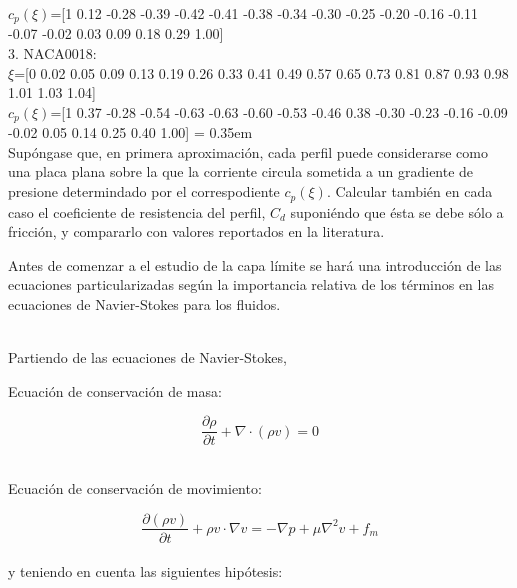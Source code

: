 \documentclass[11pt,a4paper]{article}
\begin{document}
$c_{p}(\xi)$=[1 0.12 -0.28 -0.39 -0.42 -0.41 -0.38 -0.34 -0.30 -0.25 -0.20 -0.16 -0.11 -0.07 -0.02 0.03 0.09 0.18 0.29 1.00]
\\

3. NACA0018:
\\

\hspace{1cm}
$\xi$=[0 0.02 0.05 0.09 0.13 0.19 0.26 0.33 0.41 0.49 0.57 0.65 0.73 0.81 0.87 0.93 0.98 1.01 1.03 1.04]
\\

$c_{p}(\xi)$=[1 0.37 -0.28 -0.54 -0.63 -0.63 -0.60 -0.53 -0.46 0.38 -0.30 -0.23 -0.16 -0.09 -0.02 0.05 0.14 0.25 0.40 1.00]
\font= 0.35em
\hspace{1cm}
\\

Supóngase que, en primera aproximación, cada perfil puede considerarse como una placa plana sobre la que la corriente circula sometida a un gradiente de presione determindado por el correspodiente $c_{p}(\xi)$. Calcular también en cada caso el coeficiente de resistencia del perfil, $C_{d}$ suponiéndo que ésta se debe sólo a fricción, y compararlo con valores reportados en la literatura.

\newpage

Antes de comenzar a el estudio de la capa límite se hará una introducción de las ecuaciones particularizadas según la importancia relativa de los términos en las ecuaciones de Navier-Stokes para los fluidos.

\\

Partiendo de las ecuaciones de Navier-Stokes,

\vspace{1cm}


Ecuación de conservación de masa:

\begin{equation}
\frac{\partial \rho}{\partial t} + \nabla \cdot (\rho v)=0
\end{equation}

\\

Ecuación de conservación de movimiento:

\begin{equation}
\frac{ \partial (\rho v) }{\partial{t}} + \rho v \cdot \nabla v = -\nabla p + \mu \nabla^{2} v + f_{m}
\end{equation}
\\

y teniendo en cuenta las siguientes hipótesis:
\vspace{1cm}
\end{document}
